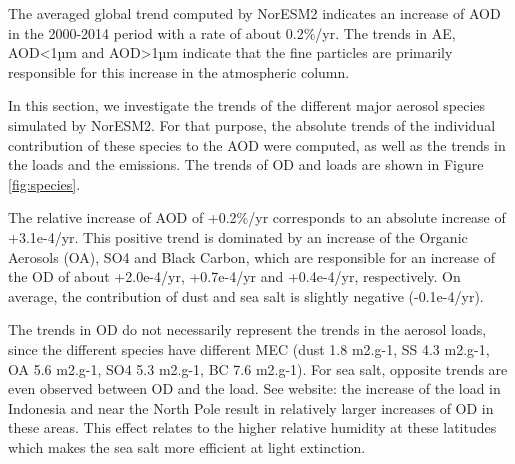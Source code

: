 \documentclass[journal abbreviation, manuscript]{copernicus}
\begin{document}
The averaged global trend computed by NorESM2 indicates an increase of AOD in the 2000-2014 period with a rate of about 0.2\%/yr. The trends in AE, AOD<1µm and AOD>1µm indicate that the fine particles are primarily responsible for this increase in the atmospheric column.

In this section, we investigate the trends of the different major aerosol species simulated by NorESM2. For that purpose, the absolute trends of the individual contribution of these species to the AOD were computed, as well as the trends in the loads and the emissions. The trends of OD and loads are shown in Figure \ref{fig:species}.

The relative increase of AOD of +0.2\%/yr corresponds to an absolute increase of +3.1e-4/yr. This positive trend is dominated by an increase of the Organic Aerosols (OA), SO4 and Black Carbon, which are responsible for an increase of the OD of about +2.0e-4/yr, +0.7e-4/yr and +0.4e-4/yr, respectively. On average, the contribution of dust and sea salt is slightly negative (-0.1e-4/yr).

The trends in OD do not necessarily represent the trends in the aerosol loads, since the different species have different MEC (dust 1.8 m2.g-1, SS 4.3 m2.g-1, OA 5.6 m2.g-1, SO4 5.3 m2.g-1, BC 7.6 m2.g-1). For sea salt, opposite trends are even observed between OD and the load. See website: the increase of the load in Indonesia and near the North Pole result in relatively larger increases of OD in these areas. This effect relates to the higher relative humidity at these latitudes which makes the sea salt more efficient at light extinction.


\conclusions  %
\end{document}
